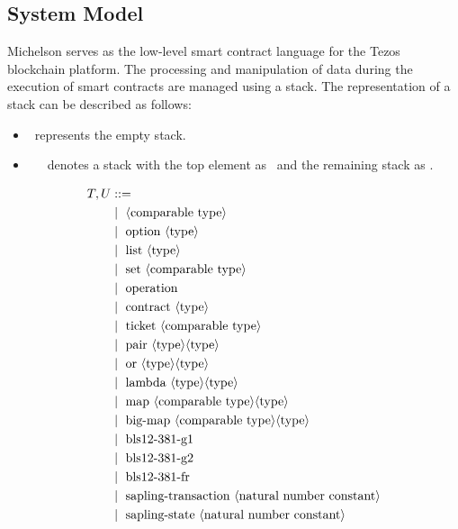 \documentclass[a4paper,UKenglish,cleveref, autoref, thm-restate]{lipics-v2021}
\begin{document}
\subsection{System Model}
Michelson serves as the low-level smart contract language for the Tezos blockchain platform. The processing and manipulation of data during the execution of smart contracts are managed using a stack. The representation of a stack can be described as follows:
\begin{itemize}
\item[]  \EMPTYSTACK\ represents the empty stack.
\item[]  \HEAD\ \STACKCONCAT\ \NTAIL\ denotes a stack with the top element as \HEAD\ and the remaining stack as \NTAIL.
\end{itemize}
\begin{figure} []
\begin{align*}
T, U &::= \\
   &\Mid\ \langle \text{comparable type}\rangle \\
   &\Mid\ \text{option}\ \langle\text{type}\rangle \\
   &\Mid\ \text{list}\ \langle\text{type}\rangle \\
   &\Mid\ \text{set}\ \langle\text{comparable type}\rangle \\
   &\Mid\ \text{operation} \\
   &\Mid\ \text{contract}\ \langle\text{type}\rangle \\
   &\Mid\ \text{ticket}\ \langle\text{comparable type}\rangle \\
   &\Mid\ \text{pair}\ \langle\text{type}\rangle \langle\text{type}\rangle \\
   &\Mid\ \text{or}\ \langle\text{type}\rangle \langle\text{type}\rangle \\
   &\Mid\ \text{lambda}\ \langle\text{type}\rangle \langle\text{type}\rangle \\
   &\Mid\ \text{map}\ \langle\text{comparable type}\rangle \langle\text{type}\rangle \\
   &\Mid\ \text{big-map}\ \langle\text{comparable type}\rangle \langle\text{type}\rangle \\
   &\Mid\ \text{bls12-381-g1} \\
   &\Mid\ \text{bls12-381-g2} \\
   &\Mid\ \text{bls12-381-fr} \\
   &\Mid\ \text{sapling-transaction}\ \langle\text{natural number constant}\rangle \\
   &\Mid\ \text{sapling-state}\ \langle\text{natural number constant}\rangle \\

\end{align*}
\end{figure}
\end{document}

